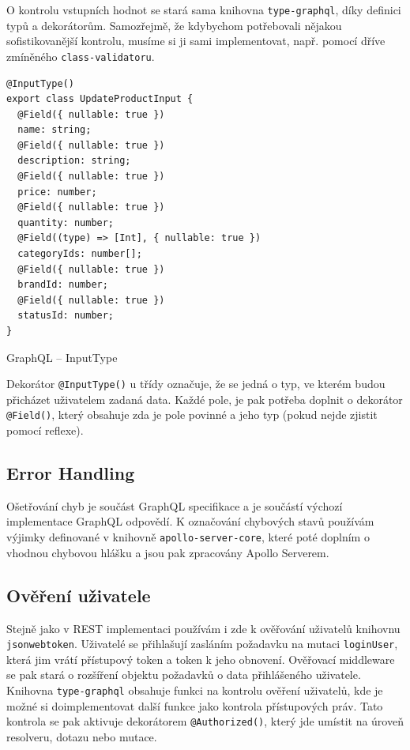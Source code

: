 \documentclass[thesis=M,czech]{FITthesis}[2019/12/23]
\begin{document}
O kontrolu vstupních hodnot se stará sama knihovna \texttt{type-graphql}, díky definici typů a dekorátorům. Samozřejmě, že kdybychom potřebovali nějakou sofistikovanější kontrolu, musíme si ji sami implementovat, např. pomocí dříve zmíněného \texttt{class-validatoru}. 

\begin{listing}[H]
\begin{verbatim}
@InputType()
export class UpdateProductInput {
  @Field({ nullable: true })
  name: string;
  @Field({ nullable: true })
  description: string;
  @Field({ nullable: true })
  price: number;
  @Field({ nullable: true })
  quantity: number;
  @Field((type) => [Int], { nullable: true })
  categoryIds: number[];
  @Field({ nullable: true })
  brandId: number;
  @Field({ nullable: true })
  statusId: number;
}
\end{verbatim}
\caption{GraphQL -- InputType}
\label{lst:graphql_inputtype}
\end{listing}

Dekorátor \texttt{@InputType()} u třídy označuje, že se jedná o typ, ve kterém budou přicházet uživatelem zadaná data. Každé pole, je pak potřeba doplnit o dekorátor \texttt{@Field()}, který obsahuje zda je pole povinné a jeho typ (pokud nejde zjistit pomocí reflexe).

\subsection{Error Handling}
Ošetřování chyb je součást GraphQL specifikace a je součástí výchozí implementace GraphQL odpovědí. K označování chybových stavů používám výjimky definované v knihovně \texttt{apollo-server-core}, které poté doplním o vhodnou chybovou hlášku a jsou pak zpracovány Apollo Serverem.

\subsection{Ověření uživatele}
Stejně jako v REST implementaci používám i zde k ověřování uživatelů knihovnu \texttt{jsonwebtoken}. Uživatelé se přihlašují zasláním požadavku na mutaci \texttt{loginUser}, která jim vrátí přístupový token a token k jeho obnovení. Ověřovací middleware se pak stará o rozšíření objektu požadavků o data přihlášeného uživatele. Knihovna \texttt{type-graphql} obsahuje funkci na kontrolu ověření uživatelů, kde je možné si doimplementovat další funkce jako kontrola přístupových práv. Tato kontrola se pak aktivuje dekorátorem \texttt{@Authorized()}, který jde umístit na úroveň resolveru, dotazu nebo mutace.
\end{document}
